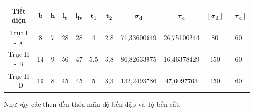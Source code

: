 \begin{table}[h!]
\centering
\begin{tabular}{|c|c|c|c|c|c|c|c|c|c|c|}
\hline
\textbf{Tiết diện} & $\mathbf{b}$ & $\mathbf{h}$ & $\mathbf{l_t}$ & $\mathbf{l_{lv}}$ & $\mathbf{t_1}$ & $\mathbf{t_2}$ & $\mathbf{\sigma_d}$ & $\mathbf{\tau_c}$ & $\mathbf{[\sigma_d]}$ & $\mathbf{[\tau_c]}$ \\
\hline
Trục I - A & 8 & 7 & 28 & 28 & 4 & 2.8 & 71,33600649 & 26,75100244 & 80 & 60 \\
\hline
Trục II - B & 14 & 9 & 56 & 47 & 5,5 & 3,8 & 86,82633975 & 16,46378429 & 150 & 60 \\
\hline
Trục II - D & 10 & 8 & 45 & 45 & 5 & 3,3 & 132,2493786 & 47,6097763 & 150 & 60 \\
\hline
\end{tabular}
\end{table}

\noindent Như vậy các then đều thỏa mãn độ bền dập và độ bền cắt.

